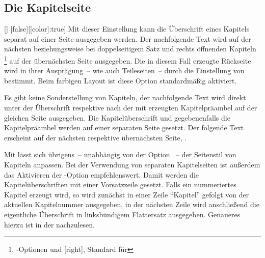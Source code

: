 \begin{Declaration*}{}
\begin{Declaration*}{}
\begin{Declaration*}{}
\subsection{Die Kapitelseite}
\begin{Declaration}{[\PBoolean]}%
  [false][[color]:true]%
\printdeclarationlist%
\label{sec:chapter}%
%
%
%
%
%
Mit dieser Einstellung kann die Überschrift eines Kapitels separat auf einer 
Seite ausgegeben werden. Der nachfolgende Text wird auf der nächsten 
beziehungsweise bei doppelseitigem Satz und rechts öffnenden Kapiteln%
\footnote{%
  \KOMAScript-Optionen  und [right], Standard für 
}
auf der übernächsten Seite ausgegeben. Die in diesem Fall erzeugte Rückseite 
wird in ihrer Ausprägung~-- wie auch Teileseiten~-- durch die Einstellung von 
 bestimmt. Beim farbigen Layout ist diese Option 
standardmäßig aktiviert. \notudscrartcl
%
\begin{values}
\itemfalse
  Es gibt keine Sonderstellung von Kapiteln, der nachfolgende Text wird direkt 
  unter der Überschrift respektive nach der mit  
  erzeugten Kapitelpräambel auf der gleichen Seite ausgegeben.
\itemtrue*
  Die Kapitelüberschrift und gegebenenfalls die Kapitelpräambel werden auf 
  einer separaten Seite gesetzt. Der folgende Text erscheint auf der nächsten   
  respektive übernächsten Seite, .
\end{values}
%
Mit %
 lässt sich übrigens~-- unabhängig von der Option 
~-- der Seitenstil von Kapiteln anpassen. Bei der 
Verwendung von separaten Kapitelseiten ist außerdem das Aktivieren der 
\KOMAScript-Option  empfehlenswert. Damit werden die
Kapitelüberschriften mit einer Vorsatzzeile gesetzt. Falls ein nummeriertes 
Kapitel erzeugt wird, so wird zunächst in einer Zeile \enquote{Kapitel} gefolgt 
von der aktuellen Kapitelnummer ausgegeben, in der nächsten Zeile wird 
anschließend die eigentliche Überschrift in linksbündigem Flattersatz 
ausgegeben. Genaueres hierzu ist in der \scrguide[\KOMAScript"=Dokumentation]
nachzulesen.
\end{Declaration}




\end{Declaration*}
\end{Declaration*}
\end{Declaration*}
